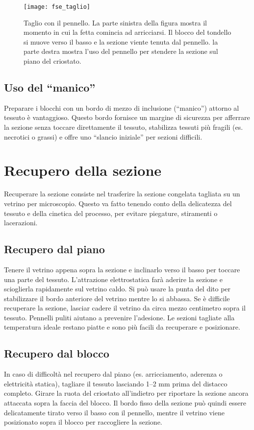 \begin{figure}[htbp]
    \centering
    \texttt{[image: fse\_taglio]}
    \caption{Taglio con il pennello. La parte sinistra della figura mostra il momento in cui la fetta comincia ad arricciarsi. Il blocco del tondello si muove verso il basso e la sezione viente tenuta dal pennello. la parte destra mostra l'uso del pennello per stendere la sezione sul piano del criostato.}
    \label{fig:fse_taglio}
\end{figure}

\subsection{Uso del ``manico''} 
Preparare i blocchi con un bordo di mezzo di inclusione (``manico'') attorno al tessuto è vantaggioso. Questo bordo fornisce un margine di sicurezza per afferrare la sezione senza toccare direttamente il tessuto, stabilizza tessuti più fragili (es. necrotici o grassi) e offre uno ``slancio iniziale'' per sezioni difficili.

\section{Recupero della sezione}
Recuperare la sezione consiste nel trasferire la sezione congelata tagliata su un vetrino per microscopio. Questo va fatto tenendo conto della delicatezza del tessuto e della cinetica del processo, per evitare piegature, stiramenti o lacerazioni.

\subsection{Recupero dal piano}
Tenere il vetrino appena sopra la sezione e inclinarlo verso il basso per toccare una parte del tessuto. L'attrazione elettrostatica farà aderire la sezione e scioglierla rapidamente sul vetrino caldo. Si può usare la punta del dito per stabilizzare il bordo anteriore del vetrino mentre lo si abbassa. Se è difficile recuperare la sezione, lasciar cadere il vetrino da circa mezzo centimetro sopra il tessuto. Pennelli puliti aiutano a prevenire l'adesione. Le sezioni tagliate alla temperatura ideale restano piatte e sono più facili da recuperare e posizionare.

\subsection{Recupero dal blocco} 
In caso di difficoltà nel recupero dal piano (es. arricciamento, aderenza o elettricità statica), tagliare il tessuto lasciando 1–2 mm prima del distacco completo. Girare la ruota del criostato all'indietro per riportare la sezione ancora attaccata sopra la faccia del blocco. Il bordo fisso della sezione può quindi essere delicatamente tirato verso il basso con il pennello, mentre il vetrino viene posizionato sopra il blocco per raccogliere la sezione.

